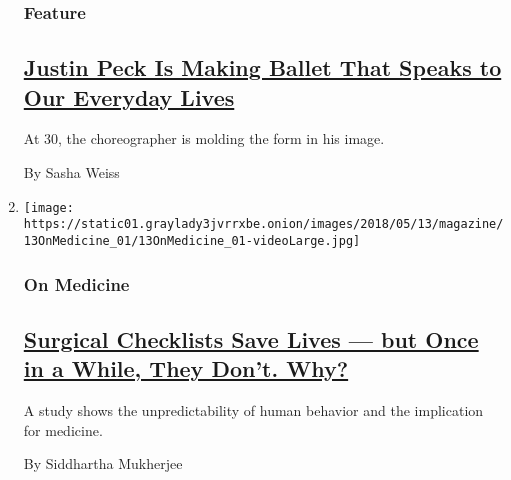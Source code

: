 \begin{enumerate}
  \hypertarget{feature-2}{%
  \subsubsection{Feature}\label{feature-2}}

  \hypertarget{justin-peck-is-making-ballet-that-speaks-to-our-everyday-lives}{%
  \subsection{\texorpdfstring{\href{/2018/05/10/magazine/justin-peck-is-making-ballet-that-speaks-to-our-everyday-lives.html}{Justin
  Peck Is Making Ballet That Speaks to Our Everyday
  Lives}}{Justin Peck Is Making Ballet That Speaks to Our Everyday Lives}}\label{justin-peck-is-making-ballet-that-speaks-to-our-everyday-lives}}

  At 30, the choreographer is molding the form in his image.

  By Sasha Weiss
\item
  \texttt{[image: https://static01.graylady3jvrrxbe.onion/images/2018/05/13/magazine/13OnMedicine\_01/13OnMedicine\_01-videoLarge.jpg]}

  \hypertarget{on-medicine}{%
  \subsubsection{On Medicine}\label{on-medicine}}

  \hypertarget{surgical-checklists-save-lives--but-once-in-a-while-they-dont-why}{%
  \subsection{\texorpdfstring{\href{/2018/05/09/magazine/surgical-checklists-save-lives-but-once-in-a-while-they-dont-why.html}{Surgical
  Checklists Save Lives --- but Once in a While, They Don't.
  Why?}}{Surgical Checklists Save Lives --- but Once in a While, They Don't. Why?}}\label{surgical-checklists-save-lives--but-once-in-a-while-they-dont-why}}

  A study shows the unpredictability of human behavior and the
  implication for medicine.

  By Siddhartha Mukherjee
\end{enumerate}


